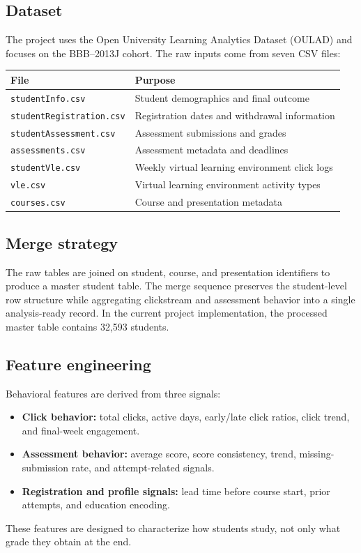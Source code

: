 \documentclass[11pt,a4paper]{article}
\begin{document}
\subsection{Dataset}
The project uses the Open University Learning Analytics Dataset (OULAD) and focuses on the BBB--2013J cohort. The raw inputs come from seven CSV files:
\begin{center}
\begin{tabular}{ll}
\toprule
File & Purpose \\
\midrule
\texttt{studentInfo.csv} & Student demographics and final outcome \\
\texttt{studentRegistration.csv} & Registration dates and withdrawal information \\
\texttt{studentAssessment.csv} & Assessment submissions and grades \\
\texttt{assessments.csv} & Assessment metadata and deadlines \\
\texttt{studentVle.csv} & Weekly virtual learning environment click logs \\
\texttt{vle.csv} & Virtual learning environment activity types \\
\texttt{courses.csv} & Course and presentation metadata \\
\bottomrule
\end{tabular}
\end{center}

\subsection{Merge strategy}
The raw tables are joined on student, course, and presentation identifiers to produce a master student table. The merge sequence preserves the student-level row structure while aggregating clickstream and assessment behavior into a single analysis-ready record. In the current project implementation, the processed master table contains 32,593 students.

\subsection{Feature engineering}
Behavioral features are derived from three signals:
\begin{itemize}[leftmargin=*]
  \item \textbf{Click behavior:} total clicks, active days, early/late click ratios, click trend, and final-week engagement.
  \item \textbf{Assessment behavior:} average score, score consistency, trend, missing-submission rate, and attempt-related signals.
  \item \textbf{Registration and profile signals:} lead time before course start, prior attempts, and education encoding.
\end{itemize}
These features are designed to characterize how students study, not only what grade they obtain at the end.
\end{document}

